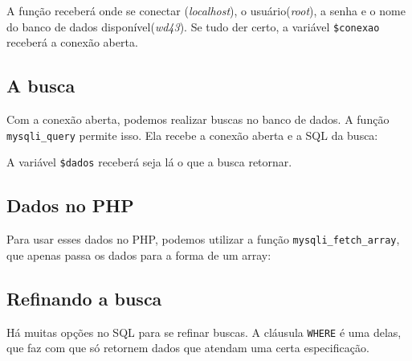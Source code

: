 \documentclass[12pt, a4paper]{article}
\begin{document}

A função receberá onde se conectar (\textit{localhost}), o usuário(\textit{root}), a senha e o nome do banco de dados disponível(\textit{wd43}). Se tudo der certo, a variável \verb|$conexao| receberá a conexão aberta.

\subsection{A busca}

Com a conexão aberta, podemos realizar buscas no banco de dados. A função \verb|mysqli_query| permite isso. Ela recebe a conexão aberta e a SQL da busca:\\


A variável \verb|$dados| receberá seja lá o que a busca retornar.

\subsection{Dados no PHP}

Para usar esses dados no PHP, podemos utilizar a função \verb|mysqli_fetch_array|, que apenas passa os dados para a forma de um array:\\


\subsection{Refinando a busca}

Há muitas opções no SQL para se refinar buscas. A cláusula \verb|WHERE| é uma delas, que faz com que só retornem dados que atendam uma certa especificação.\\

\end{document}
